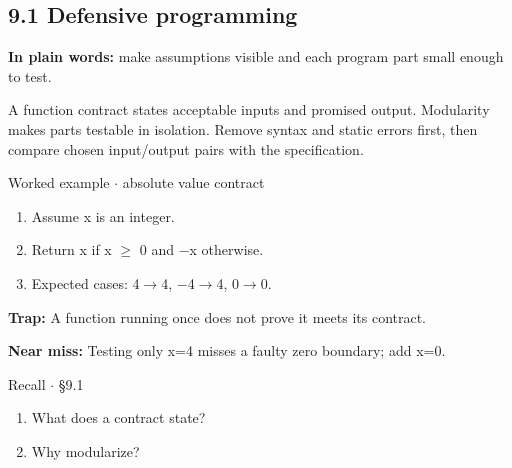 \documentclass[11pt]{article}
\begin{document}
\begin{keepsection}
\section{9.1 Defensive programming}

\begin{plainbox}\textbf{In plain words:} make assumptions visible and each program part small enough to test.\end{plainbox}

A function contract states acceptable inputs and promised output. Modularity makes parts testable in isolation. Remove syntax and static errors first, then compare chosen input/output pairs with the specification.

\begin{workedbox}{Worked example \ensuremath{\cdot} absolute value contract}
\begin{enumerate}
\item Assume x is an integer.
\item Return x if x \ensuremath{\geq} 0 and \ensuremath{-}x otherwise.
\item Expected cases: 4\ensuremath{\to}4, \ensuremath{-}4\ensuremath{\to}4, 0\ensuremath{\to}0.
\end{enumerate}
\end{workedbox}

\begin{notebox}\textbf{Trap:} A function running once does not prove it meets its contract.\end{notebox}

\begin{notebox}\textbf{Near miss:} Testing only x=4 misses a faulty zero boundary; add x=0.\end{notebox}

\begin{recallbox}{Recall \ensuremath{\cdot} §9.1}
\begin{enumerate}
\item What does a contract state?
\item Why modularize?
\end{enumerate}

\end{recallbox}
\end{keepsection}
\end{document}
